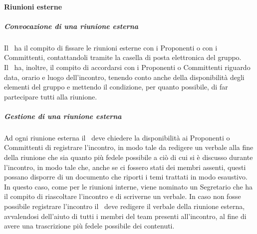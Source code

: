 \documentclass[../NormeProgetto.tex]{subfiles}
\begin{document}
			\paragraph{Riunioni esterne}
			\subparagraph{Convocazione di una riunione esterna}
			Il \responsabilediprogetto\ ha il compito di fissare le riunioni esterne con i Proponenti o con i Committenti, contattandoli tramite la casella di posta elettronica del gruppo.\\ Il \responsabilediprogetto\ ha, inoltre, il compito di accordarsi con i Proponenti o Committenti riguardo data, orario e luogo dell'incontro, tenendo conto anche della disponibilità degli elementi del gruppo e mettendo il condizione, per quanto possibile, di far partecipare tutti alla riunione.
			\subparagraph{Gestione di una riunione esterna}
			Ad ogni riunione esterna il \responsabilediprogetto\ deve chiedere la disponibilità ai Proponenti o Committenti di registrare l'incontro, in modo tale da redigere un verbale alla fine della riunione che sia quanto più fedele possibile a ciò di cui si è discusso durante l'incontro, in modo tale che, anche se ci fossero stati dei membri assenti, questi possano disporre di un documento che riporti i temi trattati in modo esaustivo. In questo caso, come per le riunioni interne, viene nominato un Segretario che ha il compito di riascoltare l'incontro e di scriverne un verbale. In caso non fosse possibile registrare l'incontro il \responsabilediprogetto\ deve redigere il verbale della riunione esterna, avvalendosi dell'aiuto di tutti i membri del team presenti all'incontro, al fine di avere una trascrizione più fedele possibile dei contenuti.
\end{document}

